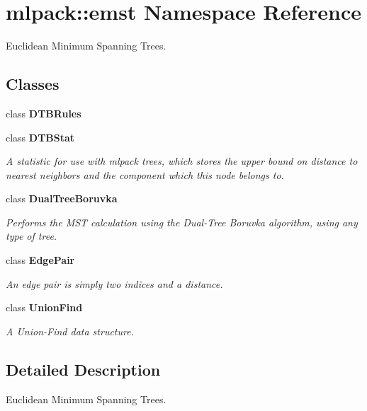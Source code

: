 \section{mlpack\+:\+:emst Namespace Reference}
\label{namespacemlpack_1_1emst}


Euclidean Minimum Spanning Trees.  


\subsection*{Classes}
\begin{DoxyCompactItemize}
\item 
class {\bf D\+T\+B\+Rules}
\item 
class {\bf D\+T\+B\+Stat}
\begin{DoxyCompactList}\small\item\em A statistic for use with mlpack trees, which stores the upper bound on distance to nearest neighbors and the component which this node belongs to. \end{DoxyCompactList}\item 
class {\bf Dual\+Tree\+Boruvka}
\begin{DoxyCompactList}\small\item\em Performs the M\+ST calculation using the Dual-\/\+Tree Boruvka algorithm, using any type of tree. \end{DoxyCompactList}\item 
class {\bf Edge\+Pair}
\begin{DoxyCompactList}\small\item\em An edge pair is simply two indices and a distance. \end{DoxyCompactList}\item 
class {\bf Union\+Find}
\begin{DoxyCompactList}\small\item\em A Union-\/\+Find data structure. \end{DoxyCompactList}\end{DoxyCompactItemize}


\subsection{Detailed Description}
Euclidean Minimum Spanning Trees. 

